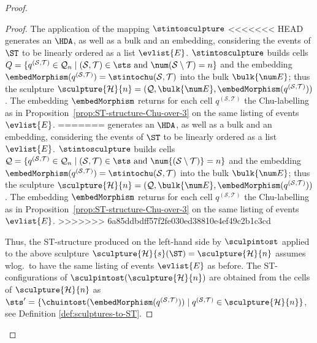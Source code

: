 \begin{proof}
\begin{proof}
        The application of the mapping $\stintosculpture$ 
<<<<<<< HEAD
        generates an $\HDA$, as well as a bulk and an embedding, considering the events of $\ST$ to be linearly ordered as a list $\evlist{E}$. $\stintosculpture$ builds cells $Q=\{q^{(\mathcal{S},\mathcal{T})}\in \mathcal{Q}_{n} \mid (\mathcal{S},\mathcal{T})\in\sts \mbox{ and } \num(\mathcal{S} \setminus \mathcal{T})=n\}$ and the embedding $\embedMorphism(q^{(\mathcal{S},\mathcal{T})})=\stintochu(\mathcal{S},\mathcal{T})$ into the bulk $\bulk{\num E}$; thus the sculpture $\sculpture{\mathcal{H}}{n}=(\mathcal{Q}, \bulk{\num E}, \embedMorphism(q^{(\mathcal{S},\mathcal{T})}))$. The embedding $\embedMorphism$ returns for each cell $q^{(\mathcal{S}, \mathcal{T})}$ the Chu-labelling as in Proposition~\ref{prop:ST-structure-Chu-over-3} on the same listing of events $\evlist{E}$.
=======
        generates an $\HDA$, as well as a bulk and an embedding, considering the events of $\ST$ to be linearly ordered as a list $\evlist{E}$. $\stintosculpture$ builds cells $\mathcal{Q}=\{q^{(\mathcal{S},\mathcal{T})}\in \mathcal{Q}_{n} \mid (\mathcal{S},\mathcal{T})\in\sts \mbox{ and } \num{(\mathcal{S} \setminus \mathcal{T})}=n\}$ and the embedding $\embedMorphism(q^{(\mathcal{S},\mathcal{T})})=\stintochu(\mathcal{S},\mathcal{T})$ into the bulk $\bulk{\num E}$; thus the sculpture $\sculpture{\mathcal{H}}{n}=(\mathcal{Q}, \bulk{\num E}, \embedMorphism(q^{(\mathcal{S},\mathcal{T})}))$. The embedding $\embedMorphism$ returns for each cell $q^{(\mathcal{S}, \mathcal{T})}$ the Chu-labelling as in Proposition~\ref{prop:ST-structure-Chu-over-3} on the same listing of events $\evlist{E}$.
>>>>>>> 6a85ddbdff57f2fe030ed38810e4ef49c2b1c3cd
   
        Thus, the ST-structure produced on the left-hand side by $\sculpintost$ applied to the above sculpture $\sculpture{\mathcal{H}}{s}(\ST)=\sculpture{\mathcal{H}}{n}$ assumes wlog.\  to have the same listing of events $\evlist{E}$ as before.
        The ST-configurations of $\sculpintost(\sculpture{\mathcal{H}}{n})$ are obtained from the cells of $\sculpture{\mathcal{H}}{n}$ as $\sts' = \{\chuintost(\embedMorphism(q^{(\mathcal{S},\mathcal{T})})) \mid q^{(\mathcal{S},\mathcal{T})} \in \sculpture{\mathcal{H}}{n}\}$, see Definition \ref{def:sculptures-to-ST}. 


\end{proof}
\end{proof}
